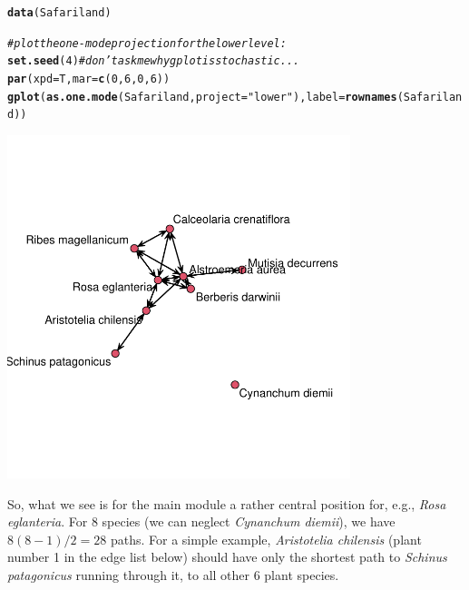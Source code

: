 \documentclass[a4paper, 11pt]{article}\usepackage[]{graphicx}\usepackage[dvipsnames]{xcolor}
\makeatletter
\newcommand{\hlnum}[1]{\textcolor[rgb]{0.686,0.059,0.569}{#1}}%
\newcommand{\hlstr}[1]{\textcolor[rgb]{0.192,0.494,0.8}{#1}}%
\newcommand{\hlcom}[1]{\textcolor[rgb]{0.678,0.584,0.686}{\textit{#1}}}%
\newcommand{\hlstd}[1]{\textcolor[rgb]{0.345,0.345,0.345}{#1}}%
\newcommand{\hlkwc}[1]{\textcolor[rgb]{0.333,0.667,0.333}{#1}}%
\newcommand{\hlkwd}[1]{\textcolor[rgb]{0.737,0.353,0.396}{\textbf{#1}}}%
\newenvironment{kframe}{%
 \def\at@end@of@kframe{}%
 \ifinner\ifhmode%
  \def\at@end@of@kframe{\end{minipage}}%
  \begin{minipage}{\columnwidth}%
 \fi\fi%
 \def\FrameCommand##1{\hskip\@totalleftmargin \hskip-\fboxsep
 \colorbox{shadecolor}{##1}\hskip-\fboxsep
     \hskip-\linewidth \hskip-\@totalleftmargin \hskip\columnwidth}%
 \MakeFramed {\advance\hsize-\width
   \@totalleftmargin\z@ \linewidth\hsize
   \@setminipage}}%
 {\par\unskip\endMakeFramed%
 \at@end@of@kframe}
\newenvironment{knitrout}{}{} %
\makeatother
\begin{document}
\begin{knitrout}
\color{fgcolor}\begin{kframe}
\begin{alltt}
\hlkwd{data}\hlstd{(Safariland)}

\hlcom{# plot the one-mode projection for the lower level:}
\hlkwd{set.seed}\hlstd{(}\hlnum{4}\hlstd{)} \hlcom{# don't ask me why gplot is stochastic ...}
\hlkwd{par}\hlstd{(}\hlkwc{xpd}\hlstd{=T,} \hlkwc{mar}\hlstd{=}\hlkwd{c}\hlstd{(}\hlnum{0}\hlstd{,}\hlnum{6}\hlstd{,}\hlnum{0}\hlstd{,}\hlnum{6}\hlstd{))}
\hlkwd{gplot}\hlstd{(}\hlkwd{as.one.mode}\hlstd{(Safariland,} \hlkwc{project}\hlstd{=}\hlstr{"lower"}\hlstd{),} \hlkwc{label}\hlstd{=}\hlkwd{rownames}\hlstd{(Safariland))}
\end{alltt}
\end{kframe}
\end{knitrout}
{
\centering
	\includegraphics[width=0.75\textwidth]{figures/betweenPlot}
}

So, what we see is for the main module a rather central position for, e.g., \emph{Rosa eglanteria}. For 8 species (we can neglect \emph{Cynanchum diemii}), we have $8(8-1)/2=28$ paths. For a simple example, \emph{Aristotelia chilensis} (plant number 1 in the edge list below) should have only the shortest path to \emph{Schinus patagonicus} running through it, to all other 6 plant species. 
\end{document}
